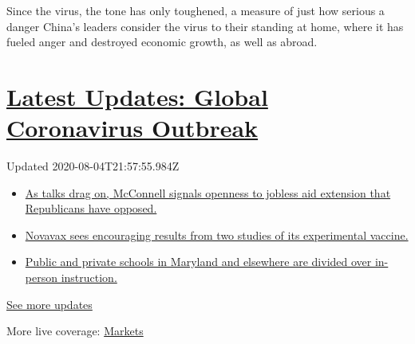Since the virus, the tone has only toughened, a measure of just how
serious a danger China's leaders consider the virus to their standing at
home, where it has fueled anger and destroyed economic growth, as well
as abroad.

\hypertarget{latest-updates-global-coronavirus-outbreak}{%
\section{\texorpdfstring{\href{https://www.nytimes3xbfgragh.onion/2020/08/04/world/coronavirus-cases.html?action=click\&pgtype=Article\&state=default\&region=MAIN_CONTENT_1\&context=storylines_live_updates}{Latest
Updates: Global Coronavirus
Outbreak}}{Latest Updates: Global Coronavirus Outbreak}}\label{latest-updates-global-coronavirus-outbreak}}

Updated 2020-08-04T21:57:55.984Z

\begin{itemize}
\tightlist
\item
  \href{https://www.nytimes3xbfgragh.onion/2020/08/04/world/coronavirus-cases.html?action=click\&pgtype=Article\&state=default\&region=MAIN_CONTENT_1\&context=storylines_live_updates\#link-2daa96b5}{As
  talks drag on, McConnell signals openness to jobless aid extension
  that Republicans have opposed.}
\item
  \href{https://www.nytimes3xbfgragh.onion/2020/08/04/world/coronavirus-cases.html?action=click\&pgtype=Article\&state=default\&region=MAIN_CONTENT_1\&context=storylines_live_updates\#link-1228a480}{Novavax
  sees encouraging results from two studies of its experimental
  vaccine.}
\item
  \href{https://www.nytimes3xbfgragh.onion/2020/08/04/world/coronavirus-cases.html?action=click\&pgtype=Article\&state=default\&region=MAIN_CONTENT_1\&context=storylines_live_updates\#link-4825b93}{Public
  and private schools in Maryland and elsewhere are divided over
  in-person instruction.}
\end{itemize}

\href{https://www.nytimes3xbfgragh.onion/2020/08/04/world/coronavirus-cases.html?action=click\&pgtype=Article\&state=default\&region=MAIN_CONTENT_1\&context=storylines_live_updates}{See
more updates}

More live coverage:
\href{https://www.nytimes3xbfgragh.onion/live/2020/08/04/business/stock-market-today-coronavirus?action=click\&pgtype=Article\&state=default\&region=MAIN_CONTENT_1\&context=storylines_live_updates}{Markets}

